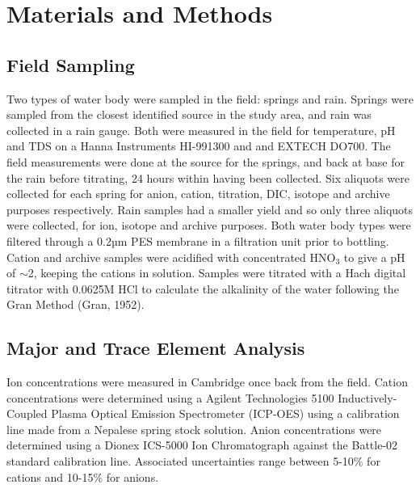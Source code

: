 
\section{Materials and Methods}



\subsection{Field Sampling}
Two types of water body were sampled in the field: springs and rain. Springs were sampled from the closest identified source in
 the study area, and rain was collected in a rain gauge.
Both were measured in the field for temperature, pH and TDS on a Hanna Instruments HI-991300 and  and EXTECH DO700. The field measurements 
were done at the source for the springs, and back at base for the rain before titrating, 
24 hours within having been collected. 
Six aliquots were collected for each spring for anion, cation, titration, DIC, isotope and archive purposes respectively. 
Rain samples had a smaller yield and so only three aliquots were collected, for ion, isotope and archive purposes. 
Both water body types were filtered through a 0.2µm PES membrane in a filtration unit prior to bottling. 
Cation and archive samples were acidified with concentrated HNO$_3$ to give a pH of $\sim$2, keeping the cations in solution. 
Samples were titrated with a Hach digital titrator with 0.0625M HCl to calculate the alkalinity of the water following the Gran Method (Gran, 1952).






\subsection{Major and Trace Element Analysis}

Ion concentrations were measured in Cambridge once back from the field. Cation concentrations were determined using a Agilent Technologies 
5100 Inductively-Coupled Plasma Optical Emission Spectrometer (ICP-OES) using a calibration line made from a Nepalese spring stock solution.
Anion concentrations were determined using a Dionex ICS-5000 Ion Chromatograph against the Battle-02 standard calibration line. Associated 
uncertainties range between 5-10\% for cations and 10-15\% for anions.


